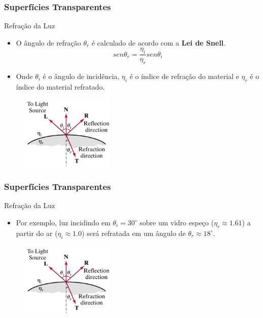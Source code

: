 \documentclass{beamer}
\begin{document}
\begin{frame}
\frametitle{Superfícies Transparentes}

	\begin{block}{Refração da Luz}
		\begin{itemize}
			\item O ângulo de refração $\theta_r$ é calculado de acordo com a \textbf{Lei de Snell}.
			\begin{equation*}
				sen \theta_r = \frac{\eta_i}{\eta_r}sen \theta_i
			\end{equation*}
			\item Onde $\theta_i$ é o ângulo de incidência, $\eta_i$ é o índice de refração do material e $\eta_r$ é o índice do material refratado.
		\end{itemize}
	\end{block}
	
	\begin{figure}[!h]
		\begin{center}
		\includegraphics[width=0.4\textwidth]{Figures/LigRef}
		\end{center}
	\end{figure}	
\end{frame}


\begin{frame}
\frametitle{Superfícies Transparentes}

	\begin{block}{Refração da Luz}
		\begin{itemize}
			\item Por exemplo, luz incidindo em $\theta_i = 30^\circ$ sobre um vidro espeço ($\eta_r \approx 1.61$) a partir do ar ($\eta_i \approx 1.0$) será refratada em um ângulo de $\theta_r \approx 18^\circ$.
		\end{itemize}
	\end{block}
	
	\begin{figure}[!h]
		\begin{center}
		\includegraphics[width=0.4\textwidth]{Figures/LigRef}
		\end{center}
	\end{figure}	
\end{frame}
\end{document}
